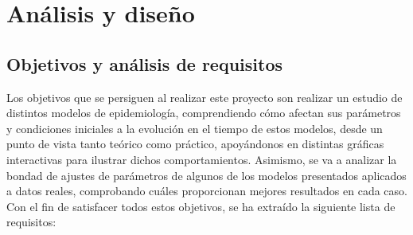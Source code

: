 
\chapter{Análisis y diseño}


\section{Objetivos y análisis de requisitos}

Los objetivos que se persiguen al realizar este proyecto son realizar un estudio de distintos modelos de epidemiología, comprendiendo cómo afectan sus parámetros y condiciones iniciales a la evolución en el tiempo de estos modelos, desde un punto de vista tanto teórico como práctico, apoyándonos en distintas gráficas interactivas para ilustrar dichos comportamientos. Asimismo, se va a analizar la bondad de ajustes de parámetros de algunos de los modelos presentados aplicados a datos reales, comprobando cuáles proporcionan mejores resultados en cada caso. Con el fin de satisfacer todos estos objetivos, se ha extraído la siguiente lista de requisitos:

